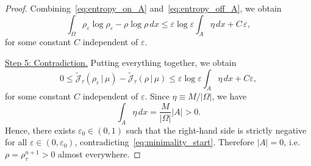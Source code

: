 \documentclass[10pt,a4paper]{amsart}
\begin{document}
\begin{proof}
Combining~\eqref{eq:entropy_on_A} and~\eqref{eq:entropy_off_A}, we obtain
\begin{equation}\label{eq:entropy_total}
\int_\Omega \rho_\varepsilon\log\rho_\varepsilon-\rho\log\rho\,dx
\le
\varepsilon\log\varepsilon\int_A \eta\,dx + C\,\varepsilon,
\end{equation}
for some constant $C$ independent of $\varepsilon$.

\medskip
\underline{Step 5: Contradiction.}
Putting everything together, we obtain
\[
0\le
\widetilde{\mathcal J}_\tau(\rho_\varepsilon\,|\,\mu)-\widetilde{\mathcal J}_\tau(\rho\,|\,\mu)
\le
\varepsilon\log\varepsilon\int_A \eta\,dx + C\varepsilon,
\]
for some constant $C$ independent of $\varepsilon$. Since $\eta\equiv M/|\Omega|$, we have
\[
\int_A \eta\,dx=\frac{M}{|\Omega|}|A|>0.
\]
Hence, there exists $\varepsilon_0\in(0,1)$ such that the right-hand side is strictly negative for all
$\varepsilon\in(0,\varepsilon_0)$, contradicting~\eqref{eq:minimality_start}.
Therefore $|A|=0$, i.e.\ $\rho=\rho_\tau^{n+1}>0$ almost everywhere.
\end{proof}
\end{document}
